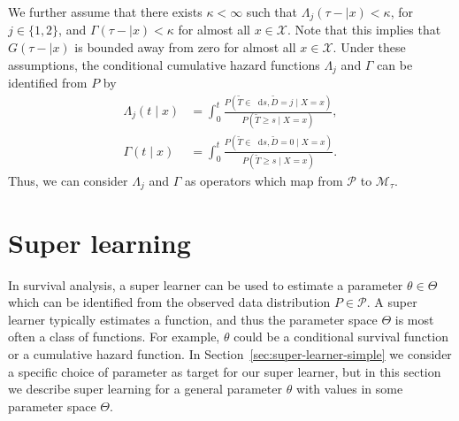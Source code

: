 \documentclass[a4paper,danish]{article}
\theoremstyle{plain} %
\numberwithin{theorem}{section}
\theoremstyle{definition} %
\theoremstyle{remark}
\newcommand*\diff{\mathop{}\!\mathrm{d}}
\newcommand{\1}{\mathds{1}}
\begin{document}
We further assume that there exists \(\kappa<\infty\) such that
\(\Lambda_{j}(\tau- \mid x)<\kappa \), for \(j\in\{1,2\}\), and
\(\Gamma(\tau- \mid x)<\kappa\) for almost all \(x\in\mathcal X\). Note that this
implies that \(G(\tau- \mid x)\) is bounded away from zero for almost all \(x\in\mathcal X\).
Under these assumptions, the conditional cumulative hazard functions
\(\Lambda_{j}\) and \(\Gamma\) can be identified from \(P\) by
\begin{align}
  \Lambda_{j}(t \mid x) &= \int_0^t\frac{  P(\tilde T \in \diff s, \tilde D=j \mid X=x )}{P(\tilde T \geq s \mid X=x )}, \label{eq:lambdaj}\\
  \Gamma(t \mid x) &= \int_0^t\frac{  P(\tilde T \in \diff s, \tilde D=0 \mid X=x )}{P(\tilde T \geq s \mid X=x )}\label{eq:gamma}.
\end{align}
Thus, we can consider $\Lambda_j$ and \(\Gamma\) as operators which map from
\( \mathcal{P} \) to \(\mathcal M_{\tau}\).

\section{Super learning}
\label{sec:super-learning}

In survival analysis, a super learner can be used to estimate
a parameter $\theta \in \Theta$ which can be identified from
the observed data distribution \(P\in\mathcal P\). A super
learner typically estimates a function, and thus the parameter
space $\Theta$ is most often a class of functions. For
example, $\theta$ could be a conditional survival function or
a cumulative hazard function. In
Section~\ref{sec:super-learner-simple} we consider a specific
choice of parameter as target for our super learner, but in
this section we describe super learning for a general
parameter $\theta$ with values in some parameter space
$\Theta$.
\end{document}
